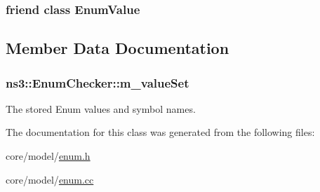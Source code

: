 \subsubsection[{\texorpdfstring{Enum\+Value}{EnumValue}}]{\setlength{\rightskip}{0pt plus 5cm}friend class {\bf Enum\+Value}\hspace{0.3cm}{\ttfamily [friend]}}\hypertarget{classns3_1_1EnumChecker_a5565403536e77f1cb3db26a8ba9b1b07}{}\label{classns3_1_1EnumChecker_a5565403536e77f1cb3db26a8ba9b1b07}


\subsection{Member Data Documentation}
\subsubsection[{\texorpdfstring{m\+\_\+value\+Set}{m_valueSet}}]{ ns3\+::\+Enum\+Checker\+::m\+\_\+value\+Set\hspace{0.3cm}{\ttfamily [private]}}\hypertarget{classns3_1_1EnumChecker_a4e9e5c4eea23237a0001c8dcb0f1cf76}{}\label{classns3_1_1EnumChecker_a4e9e5c4eea23237a0001c8dcb0f1cf76}
The stored Enum values and symbol names. 

The documentation for this class was generated from the following files\+:\begin{DoxyCompactItemize}
\item 
core/model/\hyperlink{enum_8h}{enum.\+h}\item 
core/model/\hyperlink{enum_8cc}{enum.\+cc}\end{DoxyCompactItemize}
